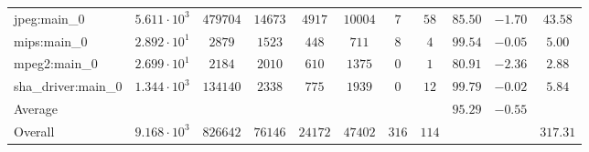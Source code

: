 \begin{tabular}{|l|c|c|c|c|c|c|c|c|c|c|}
jpeg:main\_0            & $ 5.611 \cdot 10^{3} $ & $ 479704 $ & $ 14673 $ & $ 4917  $ & $ 10004 $ & $ 7   $ & $ 58  $ & $ 85.50       $ & $ -1.70   $ & $ 43.58   $ \\
mips:main\_0            & $ 2.892 \cdot 10^{1} $ & $ 2879   $ & $ 1523  $ & $ 448   $ & $ 711   $ & $ 8   $ & $ 4   $ & $ 99.54       $ & $ -0.05   $ & $ 5.00    $ \\
mpeg2:main\_0           & $ 2.699 \cdot 10^{1} $ & $ 2184   $ & $ 2010  $ & $ 610   $ & $ 1375  $ & $ 0   $ & $ 1   $ & $ 80.91       $ & $ -2.36   $ & $ 2.88    $ \\
sha\_driver:main\_0     & $ 1.344 \cdot 10^{3} $ & $ 134140 $ & $ 2338  $ & $ 775   $ & $ 1939  $ & $ 0   $ & $ 12  $ & $ 99.79       $ & $ -0.02   $ & $ 5.84    $ \\
\hline
Average                 & $                    $ & $        $ & $       $ & $       $ & $       $ & $     $ & $     $ & $ 95.29       $ & $ -0.55   $ & $         $ \\
\hline
Overall                 & $ 9.168 \cdot 10^{3} $ & $ 826642 $ & $ 76146 $ & $ 24172 $ & $ 47402 $ & $ 316 $ & $ 114 $ & $             $ & $         $ & $ 317.31  $ \\
\hline
\end{tabular}

